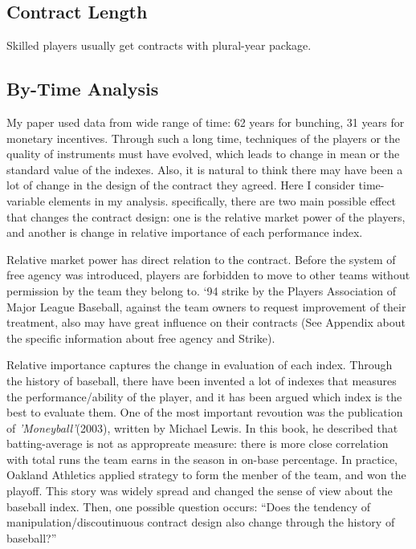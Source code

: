 \documentclass[dvipdfmx, 12pt]{article}
\begin{document}
\subsection{Contract Length}

Skilled players usually get contracts with plural-year package.

\subsection{By-Time Analysis}

My paper used data from wide range of time: 62 years for bunching, 31 years for monetary incentives. Through such a long time, techniques of the players or the quality of instruments must have evolved, which leads to change in mean or the standard value of the indexes. Also, it is natural to think there may have been a lot of change in the design of the contract they agreed. Here I consider time-variable elements in my analysis. specifically, there are two main possible effect that changes the contract design: one is the relative market power of the players, and another is change in relative importance of each performance index.

Relative market power has direct relation to the contract. Before the system of free agency was introduced, players are forbidden to move to other teams without permission by the team they belong to. `94 strike by the Players Association of Major League Baseball, against the team owners to request improvement of their treatment, also may have great influence on their contracts (See Appendix about the specific information about free agency and Strike).

Relative importance captures the change in evaluation of each index. Through the history of baseball, there have been invented a lot of indexes that measures the performance/ability of the player, and it has been argued which index is the best to evaluate them. One of the most important revoution was the publication of \textit{'Moneyball'}(2003), written by Michael Lewis. In this book, he described that batting-average is not as appropreate measure: there is more close correlation with total runs the team earns in the season in on-base percentage. In practice, Oakland Athletics applied strategy to form the menber of the team, and won the playoff. This story was widely spread and changed the sense of view about the baseball index. Then, one possible question occurs: ``Does the tendency of manipulation/discoutinuous contract design also change through the history of baseball?''
\end{document}
